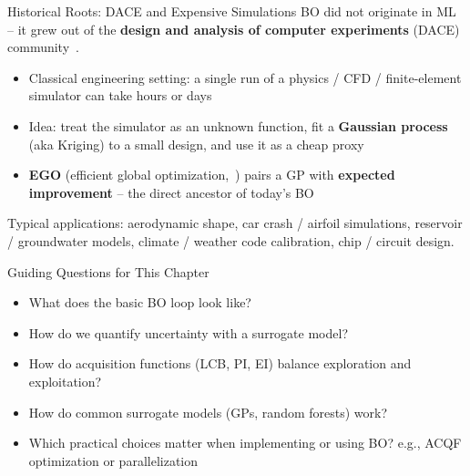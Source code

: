 \documentclass[main]{subfiles}
\begin{document}
\begin{frame}{Historical Roots: DACE and Expensive Simulations}
BO did not originate in ML -- it grew out of the \textbf{design and analysis of computer experiments} (DACE) community~.
\vspace{0.2cm}
\begin{itemize}
    \item Classical engineering setting: a single run of a physics / CFD / finite-element simulator can take hours or days
    \item Idea: treat the simulator as an unknown function, fit a \textbf{Gaussian process} (aka Kriging) to a small design, and use it as a cheap proxy
    \item \textbf{EGO} (efficient global optimization,~) pairs a GP with \textbf{expected improvement} -- the direct ancestor of today's BO
\end{itemize}
\vspace{0.2cm}
Typical applications: aerodynamic shape, car crash / airfoil simulations, reservoir / groundwater models, climate / weather code calibration, chip / circuit design.
\end{frame}

\begin{frame}[t]{Guiding Questions for This Chapter}
\begin{itemize}
    \item What does the basic BO loop look like?
    \item How do we quantify uncertainty with a surrogate model?
    \item How do acquisition functions (LCB, PI, EI) balance exploration and exploitation?
    \item How do common surrogate models (GPs, random forests) work?
    \item Which practical choices matter when implementing or using BO?
    e.g., ACQF optimization or parallelization
\end{itemize}
\end{frame}
\end{document}
